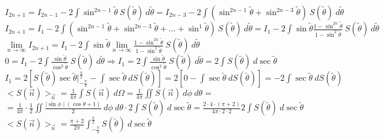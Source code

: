 	\newline
	$I_{2n+1} = I_{2n-1} -2 \int \sin^{2n-1} \tilde \theta \: S(\tilde \theta)  \: d \tilde{\theta} = 
	I_{2n-3} -2 \int (\sin^{2n-1} \tilde \theta + \sin^{2n-3} \tilde \theta) \: S(\tilde \theta)  \: d \tilde{\theta} $
	\newline
	$I_{2n+1} = I_{1} -2 \int (\sin^{2n-1} \tilde \theta + \sin^{2n-3} \tilde \theta + \dots + \sin^{1} \tilde \theta) \: S(\tilde \theta)  \: d \tilde{\theta} = I_{1} -2 \int \sin \tilde \theta \frac{1 - \sin^{2n} \tilde \theta}{1 - \sin^{2} \tilde \theta} \: S(\tilde \theta)  \: d \tilde{\theta}$
	\newline
	$ \lim\limits_{n \rightarrow \infty} I_{2n+1} =  I_{1} -2 \int \sin \tilde \theta \lim\limits_{n \rightarrow \infty} \frac{1 - \sin^{2n} \tilde \theta}{1 - \sin^{2} \tilde \theta} \: S(\tilde \theta)  \: d \tilde{\theta}$
	\newline
	$0 = I_{1} -2 \int \frac{\sin \tilde \theta}{\cos^2 \tilde \theta} \: S(\tilde \theta)  \: d \tilde{\theta} \Rightarrow 
	I_{1} =  2 \int \frac{\sin \tilde \theta}{\cos^2 \tilde \theta} \: S(\tilde \theta)  \: d \tilde{\theta} =
	2 \int  S(\tilde \theta)  \: d \sec \tilde{\theta} $
	\newline
	$I_1 = 2  [S(\tilde \theta)  \sec \tilde{\theta} \bigg|_{-\frac{\pi}{2}}^{\frac{\pi}{2}} - \int \sec \tilde{\theta} \: dS(\tilde \theta)  ] = 2 [0 - \int \sec \tilde{\theta} \: dS(\tilde \theta)  ] = -2 \int \sec \tilde{\theta} \: dS(\tilde \theta)  $
	\newline
	$<S(\vec{n})>_{\vec{n}} = \frac{1}{4\pi} \int S(\vec{n}) \: d\Omega =\frac{1}{4\pi} \iint S(\vec{n}) \: d\phi \: d\theta = $
	\newline
	$= \frac{1}{4\pi} \cdot \frac{1}{2} \iint \frac{\mid \sin \phi \mid (\cos \theta +1)}{2} \: d\phi \: d\theta \cdot 2 \int  S(\tilde \theta)  \: d \sec \tilde{\theta} = \frac{2 \cdot 4 \cdot (\pi+2)}{4\pi \cdot 2 \cdot 2}  2 \int  S(\tilde \theta)  \: d \sec \tilde{\theta}  $
	\newline
		$<S(\vec{n})>_{\vec{n}} = \frac{\pi+2}{2\pi}  \int_{-\frac{\pi}{2}}^{\frac{\pi}{2}}  S(\tilde \theta)  \: d \sec \tilde{\theta} $

